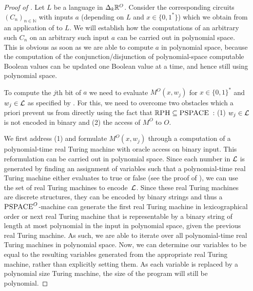 \documentclass{article}
\begin{document}
\begin{proof}[Proof of ]
    Let $L$ be a language in $\Delta_{k}\mathbb{R}^O$.
    Consider the corresponding circuits \( (C_n)_{n\in \mathbb{N}} \) with inputs \(a\) (depending on \(L\) and \(x \in \{0,1^*\}\)) which we obtain from an application of  to \(L\).
    We will establish how the computations of an arbitrary such \(C_n\) on an arbitrary such input \(a\) can be carried out in polynomial space.
    This is obvious as soon as we are able to compute \(a\) in polynomial space, because the computation of the conjunction/disjunction of polynomial-space computable Boolean values can be updated one Boolean value at a time, and hence still using polynomial space.

    To compute the \(j\)th bit of \(a\) we need to evaluate \(M^O(x,w_j)\) for \(x \in \{0,1\}^*\) and \(w_j \in \mathcal{L}\) as specified by .
    For this, we need to overcome two obstacles which a priori prevent us from directly using the fact that \(\mathbb{R}\textsc{PH} \subseteq \textsc{PSPACE}\)~\cite{ERcompendium}: (1) \(w_j \in \mathcal{L}\) is not encoded in binary and (2) the access of \(M^O\) to \(O\).
    
    We first address (1) and formulate \(M^O(x,w_j)\) through a computation of a polynomial-time real Turing machine with oracle access on binary input.
    This reformulation can be carried out in polynomial space.
    Since each number in $\mathcal{L}$ is generated by finding an assignment of variables such that a polynomial-time real Turing machine either evaluates to true or false (see the proof of ), we can use the set of real Turing machines to encode~$\mathcal{L}$.
    Since these real Turing machines are discrete structures, they can be encoded by binary strings and thus a $\textsc{PSPACE}^O$-machine can generate the first real Turing machine in lexicographical order or next real Turing machine that is representable by a binary string of length at most polynomial in the input in polynomial space, given the previous real Turing machine.
    As such, we are able to iterate over all polynomial-time real Turing machines in polynomial space.
    Now, we can determine our variables to be equal to the resulting variables generated from the appropriate real Turing machine, rather than explicitly setting them.
    As each variable is replaced by a polynomial size Turing machine, the size of the program will still be polynomial.


\end{proof}
\end{document}
